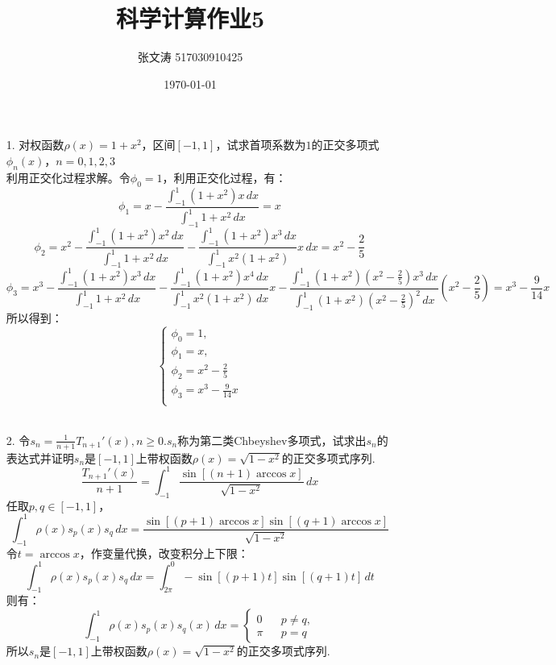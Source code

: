 \documentclass{article}
\title{科学计算作业5}
\author{张文涛 517030910425}
\date{\today}
\begin{document}
	\maketitle
	\begin{itemize}
		\item[1.]对权函数$\rho(x) = 1 + x^{2}$，区间$[-1,1]$，试求首项系数为$1$的正交多项式$\phi_{n}(x)$，$n = 0,1,2,3$\\
		利用正交化过程求解。令$\phi_{0} = 1$，利用正交化过程，有：
		$$
			\phi_{1} =x - \frac{\int_{-1}^{1} (1 + x^2)x\,dx}{\int_{-1}^{1}1+x^2\,dx} = x
		$$
		$$
			\phi_{2} =x^2 - \frac{\int_{-1}^{1} (1 + x^2)x^2\,dx}{\int_{-1}^{1}1+x^2\,dx}  - \frac{\int_{-1}^{1} (1 + x^2)x^3\,dx}{\int_{-1}^{1}x^{2}(1+x^2)}x\,dx= x^2 - \frac{2}{5}
		$$
		$$
			\phi_{3} =x^3 - \frac{\int_{-1}^{1} (1 + x^2)x^3\,dx}{\int_{-1}^{1}1+x^2\,dx}  - \frac{\int_{-1}^{1} (1 + x^2)x^4\,dx}{\int_{-1}^{1}x^{2}(1+x^2)\,dx}x -\frac{\int_{-1}^{1}(1+x^2)(x^2-\frac{2}{5})x^{3}\,dx}{\int_{-1}^{1}(1+x^2)(x^2 - \frac{2}{5})^{2}\,dx}(x^2 - \frac{2}{5}) = x^3 - \frac{9}{14}x
		$$
		所以得到：
		$$
		\left\{
			\begin{array}{lcl}
				\phi_{0} = 1, \\
				\phi_{1} =x,\\
				\phi_{2} =x^2 -  \frac{2}{5}\\
				\phi_{3} =  x^3 - \frac{9}{14}x\\
			\end{array}
		\right.
		$$\\
		\item[2.]令$s_{n} = \frac{1}{n+1}T_{n+1}'(x), n \ge 0$.$s_{n}$称为第二类Chbeyshev多项式，试求出$s_{n}$的表达式并证明${s_{n}}$是$[-1,1]$上带权函数$\rho(x) = \sqrt{1-x^{2}}$的正交多项式序列.\\
		$$
		\frac{T_{n+1}'(x)}{n+1} = \int_{-1}^{1}\frac{\sin[(n+1)\arccos x]}{\sqrt{1-x^2}}\, dx
		$$
		任取$p, q \in [-1, 1]$，
		$$
			\int_{-1}^{1}\rho(x)s_{p}(x)s_{q}\,dx = \frac{\sin[(p+1)\arccos x] \sin[(q+1)\arccos x]}{\sqrt{1-x^2}}
		$$
		令$t = \arccos x$，作变量代换，改变积分上下限：
		$$
				\int_{-1}^{1}\rho(x)s_{p}(x)s_{q}\,dx =\int_{2\pi}^{0} -\sin[(p+1)t] \sin[(q+1)t]\,dt
		$$
		则有：
		$$
		\int_{-1}^{1}\rho(x)s_{p}(x)s_{q}(x)\,dx = \left\{
			\begin{array}{lcl}
			0 && p\ne q,\\
			\pi && p = q
			\end{array}
		\right.$$
		所以${s_{n}}$是$[-1,1]$上带权函数$\rho(x) = \sqrt{1-x^{2}}$的正交多项式序列.\\\\

\end{itemize}
\end{document}
